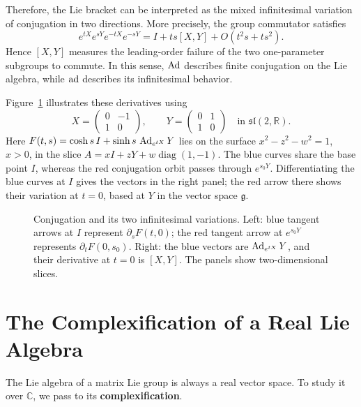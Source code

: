 \documentclass[../main.tex]{subfiles}
\begin{document}
\begin{remark}
  Therefore, the Lie bracket can be interpreted as the mixed infinitesimal variation of conjugation in two directions. More precisely, the group commutator satisfies
  \begin{equation}
    e^{tX}e^{sY}e^{-tX}e^{-sY}
    =I+ts[X,Y]+O(t^2s+ts^2).
  \end{equation}
  Hence $[X,Y]$ measures the leading-order failure of the two one-parameter subgroups to commute. In this sense, $\operatorname{Ad}$ describes finite conjugation on the Lie algebra, while $\operatorname{ad}$ describes its infinitesimal behavior.
\end{remark}

Figure~\ref{fig:adjoint-conjugation-geometry} illustrates these derivatives using
\begin{equation*}
  X=\begin{pmatrix}0&-1\\1&0\end{pmatrix},\qquad
  Y=\begin{pmatrix}0&1\\1&0\end{pmatrix}
  \quad\text{in }\mathfrak{sl}(2,\mathbb{R}).
\end{equation*}
Here $F(t,s)=\cosh s\,I+\sinh s\,\operatorname{Ad}_{e^{tX}}Y$ lies on the surface $x^2-z^2-w^2=1$, $x>0$, in the slice $A=xI+zY+w\operatorname{diag}(1,-1)$. The blue curves share the base point $I$, whereas the red conjugation orbit passes through $e^{s_0Y}$. Differentiating the blue curves at $I$ gives the vectors in the right panel; the red arrow there shows their variation at $t=0$, based at $Y$ in the vector space $\mathfrak{g}$.

\begin{figure}[H]
    \centering
    \caption{Conjugation and its two infinitesimal variations. Left: blue tangent arrows at $I$ represent $\partial_sF(t,0)$; the red tangent arrow at $e^{s_0Y}$ represents $\partial_tF(0,s_0)$. Right: the blue vectors are $\operatorname{Ad}_{e^{tX}}Y$, and their derivative at $t=0$ is $[X,Y]$. The panels show two-dimensional slices.}
    \label{fig:adjoint-conjugation-geometry}
\end{figure}

\section{The Complexification of a Real Lie Algebra}
The Lie algebra of a matrix Lie group is always a real vector space. To study it over $\mathbb{C}$, we pass to its \textbf{complexification}.
\end{document}
